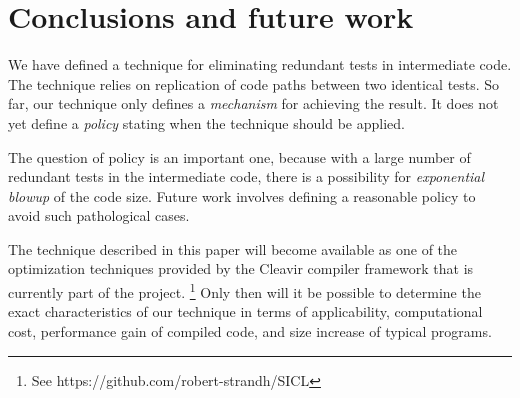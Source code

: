 \section{Conclusions and future work}

We have defined a technique for eliminating redundant tests in
intermediate code.  The technique relies on replication of code paths
between two identical tests.  So far, our technique only defines a
\emph{mechanism} for achieving the result.  It does not yet define a
\emph{policy} stating when the technique should be applied.

The question of policy is an important one, because with a large
number of redundant tests in the intermediate code, there is a
possibility for \emph{exponential blowup} of the code size.
Future work involves defining a reasonable policy to avoid such
pathological cases.

The technique described in this paper will become available as one of
the optimization techniques provided by the Cleavir compiler framework
that is currently part of the \sicl{} project.%
\footnote{See https://github.com/robert-strandh/SICL}  Only then will
it be possible to determine the exact characteristics of our technique in
terms of applicability, computational cost, performance gain of
compiled code, and size increase of typical programs.
